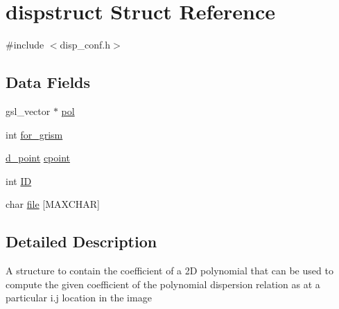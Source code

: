 \hypertarget{structdispstruct}{
\section{dispstruct Struct Reference}
\label{structdispstruct}
}


{\ttfamily \#include $<$disp\_\-conf.h$>$}\subsection*{Data Fields}
\begin{DoxyCompactItemize}
\item 
gsl\_\-vector $\ast$ \hyperlink{structdispstruct_aa3d9b87899d74411311e3a0ab60eeb20}{pol}
\item 
int \hyperlink{structdispstruct_ac05fe270c9ee7b243421a69226068ee9}{for\_\-grism}
\item 
\hyperlink{structd__point}{d\_\-point} \hyperlink{structdispstruct_afec7c60794164585d3c86f3e588f3060}{cpoint}
\item 
int \hyperlink{structdispstruct_a2733c14f8bb3ad51ceb8dc526dc9b426}{ID}
\item 
char \hyperlink{structdispstruct_ae198a71887c5bcde0adfea06f0c721ad}{file} \mbox{[}MAXCHAR\mbox{]}
\end{DoxyCompactItemize}


\subsection{Detailed Description}
A structure to contain the coefficient of a 2D polynomial that can be used to compute the given coefficient of the polynomial dispersion relation as at a particular i.j location in the image 

